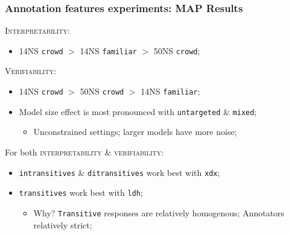 \documentclass[handout,xcolor={dvipsnames}]{beamer}
\newcommand{\feat}[1]{\textsc{#1}}
\newcommand{\param}[1]{\texttt{#1}}
\begin{document}
\begin{frame}
\frametitle{Annotation features experiments: MAP Results}
\vspace{-.5em}
\pause
\feat{Interpretability}:
\begin{itemize}
\pause
\item 14NS \param{crowd} $>$ 14NS \param{familiar} $>$ 50NS \param{crowd};
\end{itemize}

\vspace{1em}

\pause
\feat{Verifiability}:
\begin{itemize}
\pause
\item 14NS \param{crowd} $>$ 50NS \param{crowd} $>$ 14NS \param{familiar};
\pause
\item Model size effect is most pronounced with \param{untargeted} \& \param{mixed};
\begin{itemize}
\pause
\item Unconstrained settings; larger models have more noise;
\end{itemize}
\end{itemize}

\vspace{1em}

\pause
For both \feat{interpretability} \& \feat{verifiability}:
\begin{itemize}
\pause
\item \param{intransitives} \& \param{ditransitives} work best with \param{xdx};
\pause
\item \param{transitives} work best with \param{ldh};
\begin{itemize}
\pause
\item Why? \param{Transitive} responses are relatively homogenous; Annotators relatively strict;
\end{itemize}
\end{itemize}
\end{frame}
\end{document}
